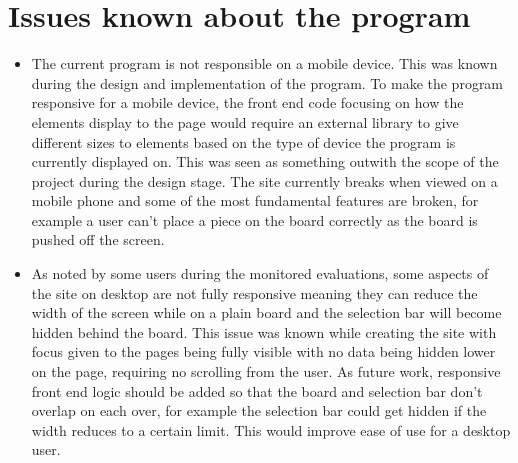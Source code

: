 \documentclass{l4proj}
\begin{document}
\section{Issues known about the program}
\label{section:issues}
\begin{itemize}
    \item The current program is not responsible on a mobile device. This was known during the design and implementation of the program. To make the program responsive for a mobile device, the front end code focusing on how the elements display to the page would require an external library to give different sizes to elements based on the type of device the program is currently displayed on. This was seen as something outwith the scope of the project during the design stage. The site currently breaks when viewed on a mobile phone and some of the most fundamental features are broken, for example a user can't place a piece on the board correctly as the board is pushed off the screen.
    \item As noted by some users during the monitored evaluations, some aspects of the site on desktop are not fully responsive meaning they can reduce the width of the screen while on a plain board and the selection bar will become hidden behind the board. This issue was known while creating the site with focus given to the pages being fully visible with no data being hidden lower on the page, requiring no scrolling from the user. As future work, responsive front end logic should be added so that the board and selection bar don't overlap on each over, for example the selection bar could get hidden if the width reduces to a certain limit. This would improve ease of use for a desktop user.

\end{itemize}
\end{document}
